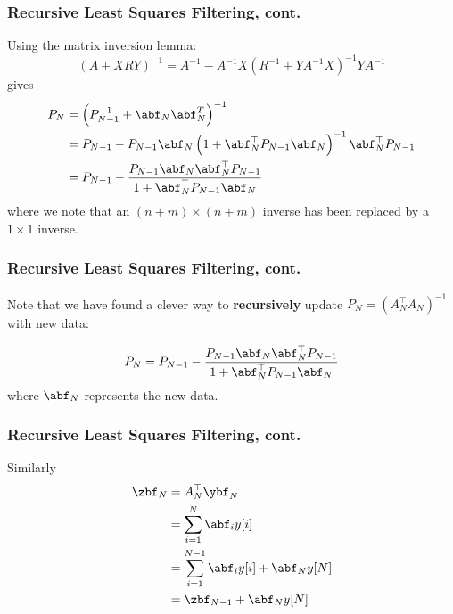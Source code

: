 \documentclass{beamer}
\begin{document}
\begin{frame}\frametitle{Recursive Least Squares Filtering, cont.}
	Using the matrix inversion lemma:
		\[ (A + XRY)^{-1} = A^{-1} - A^{-1}X(R^{-1}+YA^{-1}X)^{-1}YA^{-1} \]
	gives
	\begin{align*}
		P_{N} &= \left(P_{N-1}^{-1} + \abf_N \abf_N^T \right)^{-1} \\
			  &= P_{N-1} - P_{N-1}\abf_N\left(1+\abf_N^\top P_{N-1}\abf_N\right)^{-1}\abf_N^\top P_{N-1} \\
			  &= P_{N-1} - \frac{P_{N-1}\abf_N\abf_N^\top P_{N-1}}{1+\abf_N^\top P_{N-1}\abf_N}
	\end{align*}
	where we note that an $(n+m)\times (n+m)$ inverse has been replaced by a $1\times 1$ inverse.
\end{frame}

\begin{frame}\frametitle{Recursive Least Squares Filtering, cont.}
	Note that we have found a clever way to {\bf recursively} update $P_N = (A_N^\top A_N)^{-1}$ with new data:
	
	\[
	P_{N} = P_{N-1} - \frac{P_{N-1}\abf_N\abf_N^\top P_{N-1}}{1+\abf_N^\top P_{N-1}\abf_N}
	\]
	where $\abf_N$ represents the new data.
	
\end{frame}


\begin{frame}\frametitle{Recursive Least Squares Filtering, cont.}
	Similarly
		\begin{align*}
			\zbf_N &= A_N^\top \ybf_N \\
			 	&= \sum_{i=1}^N \abf_i y[i] \\
			 	&= \sum_{i=1}^{N-1} \abf_i y[i] + \abf_N y[N] \\
				&= \zbf_{N-1} + \abf_N y[N]
		\end{align*}
\end{frame}
\end{document}

